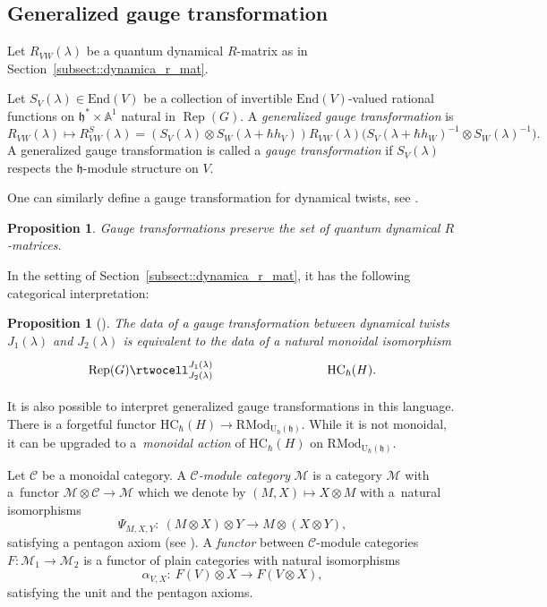 \documentclass[10pt,a4paper]{article}
\numberwithin{equation}{section}
\newtheorem{Proposition}[Theorem]{Proposition}
{ \theoremstyle{definition}
	\newtheorem{Definition}[Theorem]{Definition}
	\newtheorem{Note}[Theorem]{Note}
	\newtheorem{Example}[Theorem]{Example}
	\newtheorem{Remark}[Theorem]{Remark} }
\newcommand{\cC}{\mathcal{C}}
\newcommand{\cM}{\mathcal{M}}
\newcommand{\U}{\mathrm{U}_{\hbar}}
\newcommand{\h}{\mathfrak{h}}
\newcommand{\End}{\mathrm{End}}
\newcommand{\HC}{\mathrm{HC}_{\hbar}}
\newcommand{\RMod}{\mathrm{RMod}}
\DeclareMathOperator{\Rep}{Rep}
\begin{document}
	\subsection{Generalized gauge transformation}
	
	Let $R_{VW}(\lambda)$ be a quantum dynamical $R$-matrix as in Section~\ref{subsect::dynamica_r_mat}.
	\begin{Definition}
		Let $S_V(\lambda) \in \End(V)$ be a collection of invertible $\End(V)$-valued rational functions on $\h^* \times \mathbb{A}^1$ natural in $\Rep(G)$. A \emph{generalized gauge transformation} is
		\[
		R_{VW}	(\lambda) \mapsto R^S_{VW}(\lambda) = (S_V(\lambda) \otimes S_W(\lambda+\hbar h_V)) R_{VW}(\lambda) \bigl(S_V(\lambda +\hbar h_W)^{-1} \otimes S_W(\lambda)^{-1}\bigr).
		\]
		A generalized gauge transformation is called a \emph{gauge transformation} if $S_V(\lambda)$ respects the $\h$-module structure on $V$.
	\end{Definition}
	
	One can similarly define a gauge transformation for dynamical twists, see \cite{EtingofSchiffmann}.
	
	\begin{Proposition}
		Gauge transformations preserve the set of quantum dynamical $R$-matrices.
	\end{Proposition}
	
	In the setting of Section~\ref{subsect::dynamica_r_mat}, it has the following categorical interpretation:
	\begin{Proposition}[{\cite[Proposition 3.8]{KalmykovSafronov}}]
		The data of a gauge transformation between dynamical twists $J_1(\lambda)$ and $J_2(\lambda)$ is equivalent to the data of a natural monoidal isomorphism
		\[
		\xymatrix@C=3cm{
			\Rep(G) \rtwocell^{J_1(\lambda)}_{J_2(\lambda)} & \HC(H).
		}
		\]
	\end{Proposition}
	
	It is also possible to interpret generalized gauge transformations in this language. There is a forgetful functor $\HC(H) \rightarrow \RMod_{\U(\h)}$. While it is not monoidal, it can be upgraded to a~\emph{monoidal action} of $\HC(H)$ on $\RMod_{\U(\h)}$.
	\begin{Definition}
		\label{def::monoidal_action}
		Let $\cC$ be a monoidal category. A \emph{$\cC$-module category} $\cM$ is a category $\cM$ with a~functor $\cM \otimes \cC \rightarrow \cM$ which we denote by $(M,X) \mapsto X \otimes M$ with a~natural isomorphisms
		\[
		\Psi_{M,X,Y}\colon\ (M \otimes X) \otimes Y \rightarrow M \otimes (X \otimes Y),
		\]
		satisfying a pentagon axiom (see \cite{EGNO}). A \emph{functor} between $\cC$-module categories $F\colon \cM_1 \rightarrow \cM_2$ is a functor of plain categories with natural isomorphisms
		\[
		\alpha_{V,X} \colon\ F(V) \otimes X \rightarrow F(V \otimes X),
		\]
		satisfying the unit and the pentagon axioms.
	\end{Definition}
	
\end{document}
